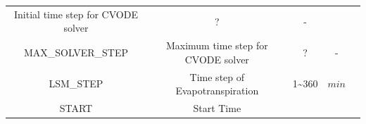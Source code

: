 \documentclass[]{scrbook}
\begin{document}
\begin{longtable}[]{@{}ccccc@{}}
\begin{minipage}[t]{0.23\columnwidth}
Initial time step for CVODE solver\strut
\end{minipage} & \begin{minipage}[t]{0.10\columnwidth}\centering\strut
?\strut
\end{minipage} & \begin{minipage}[t]{0.10\columnwidth}\centering\strut
-\strut
\end{minipage} & \begin{minipage}[t]{0.26\columnwidth}\centering\strut
\strut
\end{minipage}\tabularnewline
\begin{minipage}[t]{0.17\columnwidth}\centering\strut
MAX\_SOLVER\_STEP\strut
\end{minipage} & \begin{minipage}[t]{0.23\columnwidth}\centering\strut
Maximum time step for CVODE solver\strut
\end{minipage} & \begin{minipage}[t]{0.10\columnwidth}\centering\strut
?\strut
\end{minipage} & \begin{minipage}[t]{0.10\columnwidth}\centering\strut
-\strut
\end{minipage} & \begin{minipage}[t]{0.26\columnwidth}\centering\strut
\strut
\end{minipage}\tabularnewline
\begin{minipage}[t]{0.17\columnwidth}\centering\strut
LSM\_STEP\strut
\end{minipage} & \begin{minipage}[t]{0.23\columnwidth}\centering\strut
Time step of Evapotranspiration\strut
\end{minipage} & \begin{minipage}[t]{0.10\columnwidth}\centering\strut
1\textasciitilde{}360\strut
\end{minipage} & \begin{minipage}[t]{0.10\columnwidth}\centering\strut
\(min\)\strut
\end{minipage} & \begin{minipage}[t]{0.26\columnwidth}\centering\strut
\strut
\end{minipage}\tabularnewline
\begin{minipage}[t]{0.17\columnwidth}\centering\strut
START\strut
\end{minipage} & \begin{minipage}[t]{0.23\columnwidth}\centering\strut
Start Time\strut
\end{minipage} & \begin{minipage}[t]{0.10\columnwidth}\centering\strut

\end{minipage}
\end{longtable}
\end{document}
